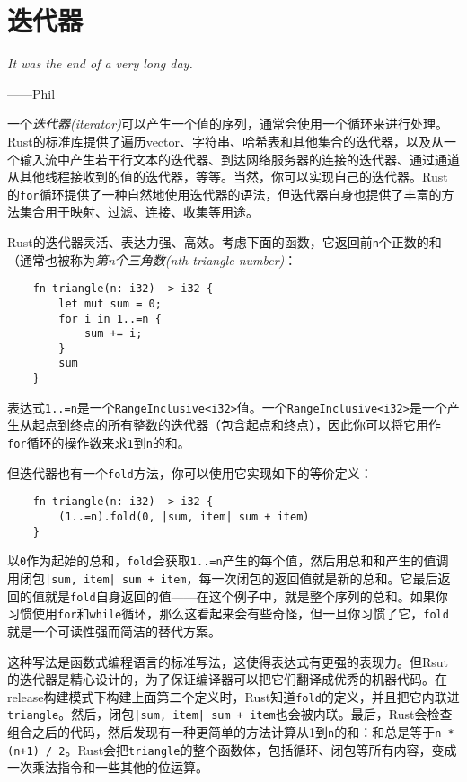 \chapter{迭代器}\label{ch15}

\emph{It was the end of a very long day.}

\begin{flushright}
    ——Phil
\end{flushright}

一个\emph{迭代器(iterator)}可以产生一个值的序列，通常会使用一个循环来进行处理。Rust的标准库提供了遍历vector、字符串、哈希表和其他集合的迭代器，以及从一个输入流中产生若干行文本的迭代器、到达网络服务器的连接的迭代器、通过通道从其他线程接收到的值的迭代器，等等。当然，你可以实现自己的迭代器。Rust的\texttt{for}循环提供了一种自然地使用迭代器的语法，但迭代器自身也提供了丰富的方法集合用于映射、过滤、连接、收集等用途。

Rust的迭代器灵活、表达力强、高效。考虑下面的函数，它返回前\texttt{n}个正数的和（通常也被称为\emph{第n个三角数(nth triangle number)}：
\begin{verbatim}
    fn triangle(n: i32) -> i32 {
        let mut sum = 0;
        for i in 1..=n {
            sum += i;
        }
        sum
    }
\end{verbatim}

表达式\texttt{1..=n}是一个\texttt{RangeInclusive<i32>}值。一个\texttt{RangeInclusive<i32>}是一个产生从起点到终点的所有整数的迭代器（包含起点和终点），因此你可以将它用作\texttt{for}循环的操作数来求\texttt{1}到\texttt{n}的和。

但迭代器也有一个\texttt{fold}方法，你可以使用它实现如下的等价定义：
\begin{verbatim}
    fn triangle(n: i32) -> i32 {
        (1..=n).fold(0, |sum, item| sum + item)
    }
\end{verbatim}

以\texttt{0}作为起始的总和，\texttt{fold}会获取\texttt{1..=n}产生的每个值，然后用总和和产生的值调用闭包\texttt{|sum, item| sum + item}，每一次闭包的返回值就是新的总和。它最后返回的值就是\texttt{fold}自身返回的值——在这个例子中，就是整个序列的总和。如果你习惯使用\texttt{for}和\texttt{while}循环，那么这看起来会有些奇怪，但一旦你习惯了它，\texttt{fold}就是一个可读性强而简洁的替代方案。

这种写法是函数式编程语言的标准写法，这使得表达式有更强的表现力。但Rsut的迭代器是精心设计的，为了保证编译器可以把它们翻译成优秀的机器代码。在release构建模式下构建上面第二个定义时，Rust知道\texttt{fold}的定义，并且把它内联进\texttt{triangle}。然后，闭包\texttt{|sum, item| sum + item}也会被内联。最后，Rust会检查组合之后的代码，然后发现有一种更简单的方法计算从1到\texttt{n}的和：和总是等于\texttt{n * (n+1) / 2}。Rust会把\texttt{triangle}的整个函数体，包括循环、闭包等所有内容，变成一次乘法指令和一些其他的位运算。

